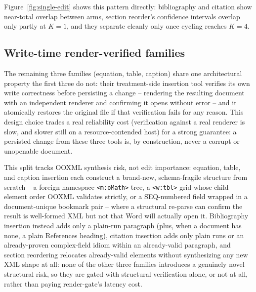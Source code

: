 \documentclass[11pt]{article}
\DeclareRobustCommand{\claim}[2]{#2}
\begin{document}
\claim{forest-figure-ci-overlap}{Figure~\ref{fig:single-edit} shows this pattern directly: \claim{four-rows-two-corpus-stages}{\claim{section-reorder-k1-directional-not-significant}{\claim{single-edit-no-advantage}{\claim{bib-citation-parity}{bibliography and citation show
near-total overlap between arms,} section reorder's confidence intervals overlap only partly at
$K=1$, and they separate cleanly only once cycling reaches $K=4$}.}}}

\subsection{Write-time render-verified families}
\label{sec:render-gate}

\claim{render-gated-three-families}{The remaining three families (equation, table, caption) share one architectural property the
first three do not: their treatment-side insertion tool verifies its own write correctness before
persisting a change -- rendering the resulting document with an independent renderer} and
confirming it opens without error -- and it atomically restores the original file if that
verification fails for any reason. \claim{verification-confound-reliability-cost}{This design choice trades a real reliability cost
(verification against a real renderer is slow, and slower still on a resource-contended host)}
for a strong guarantee: \claim{never-persist-corrupt-document}{a persisted change from these three tools is, by construction, never a
corrupt or unopenable document.}

This split tracks OOXML synthesis risk, not edit importance: \claim{native-ooxml-structures}{equation, table, and caption
insertion each construct a brand-new, schema-fragile structure from scratch -- a foreign-namespace
\texttt{<m:oMath>} tree, a \texttt{<w:tbl>} grid whose child element order OOXML validates
strictly, or a SEQ-numbered field wrapped in a document-unique bookmark pair} -- where a structural
re-parse can confirm the result is well-formed XML but not that Word will actually open it.
\claim{render-gated-three-families}{\claim{bib-citation-mechanical-simplicity}{Bibliography insertion instead adds only a plain-run paragraph (plus, when
a document has none, a plain References heading), citation insertion adds only plain runs or an
already-proven complex-field idiom within an already-valid paragraph, and section reordering
relocates already-valid elements without synthesizing any new XML shape at all: none of the other
three families introduces a genuinely novel structural risk, so they are gated with structural
verification alone, or not at all, rather than paying render-gate's latency cost.}}
\end{document}
